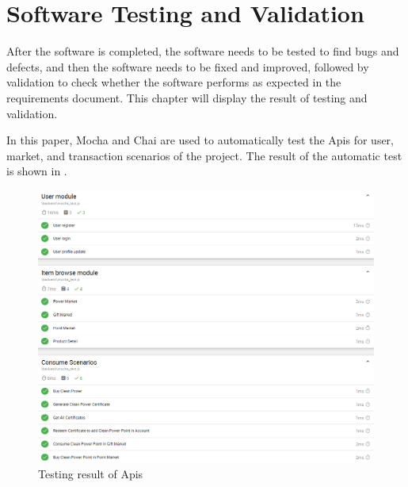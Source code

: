 \chapter{Software Testing and Validation} \label{chapter:testing}
After the software is completed, the software needs to be tested to find bugs and defects, and then the software needs to be fixed and improved, followed by validation to check whether the software performs as expected in the requirements document. This chapter will display the result of testing and validation.

In this paper, Mocha and Chai are used to automatically test the Apis for user, market, and transaction scenarios of the project. The result of the automatic test is shown in .
\begin{figure}[!htb]
    \centering
    \includegraphics[width=.8 \textwidth]{img/testresult.png}
    \caption{Testing result of Apis}
    \label{fig:testapi}
\end{figure}

